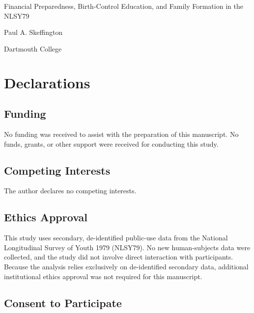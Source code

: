 \documentclass[12pt]{article}
\begin{document}

\begin{center}
{\Large Financial Preparedness, Birth-Control Education, and Family Formation in the NLSY79}\par
\vspace{1em}
Paul A. Skeffington\par
Dartmouth College\par
\end{center}

\vspace{1em}

\section*{Declarations}

\subsection*{Funding}

No funding was received to assist with the preparation of this manuscript. No funds, grants, or other support were received for conducting this study.

\subsection*{Competing Interests}

The author declares no competing interests.

\subsection*{Ethics Approval}

This study uses secondary, de-identified public-use data from the National Longitudinal Survey of Youth 1979 (NLSY79). No new human-subjects data were collected, and the study did not involve direct interaction with participants. Because the analysis relies exclusively on de-identified secondary data, additional institutional ethics approval was not required for this manuscript.

\subsection*{Consent to Participate}
\end{document}
